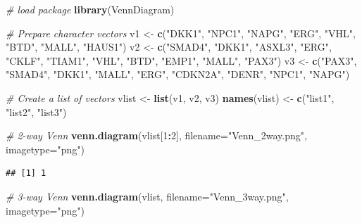 \documentclass[]{book}
\newenvironment{Shaded}{\begin{snugshade}}{\end{snugshade}}
\newcommand{\CommentTok}[1]{\textcolor[rgb]{0.56,0.35,0.01}{\textit{#1}}}
\newcommand{\DataTypeTok}[1]{\textcolor[rgb]{0.13,0.29,0.53}{#1}}
\newcommand{\DecValTok}[1]{\textcolor[rgb]{0.00,0.00,0.81}{#1}}
\newcommand{\KeywordTok}[1]{\textcolor[rgb]{0.13,0.29,0.53}{\textbf{#1}}}
\newcommand{\NormalTok}[1]{#1}
\newcommand{\OperatorTok}[1]{\textcolor[rgb]{0.81,0.36,0.00}{\textbf{#1}}}
\newcommand{\StringTok}[1]{\textcolor[rgb]{0.31,0.60,0.02}{#1}}
\begin{document}
\begin{Shaded}
\begin{Highlighting}[]
\CommentTok{# load package}
\KeywordTok{library}\NormalTok{(VennDiagram)}

\CommentTok{# Prepare character vectors}
\NormalTok{v1 <-}\StringTok{ }\KeywordTok{c}\NormalTok{(}\StringTok{"DKK1"}\NormalTok{, }\StringTok{"NPC1"}\NormalTok{, }\StringTok{"NAPG"}\NormalTok{, }\StringTok{"ERG"}\NormalTok{, }\StringTok{"VHL"}\NormalTok{, }\StringTok{"BTD"}\NormalTok{, }\StringTok{"MALL"}\NormalTok{, }\StringTok{"HAUS1"}\NormalTok{)}
\NormalTok{v2 <-}\StringTok{ }\KeywordTok{c}\NormalTok{(}\StringTok{"SMAD4"}\NormalTok{, }\StringTok{"DKK1"}\NormalTok{, }\StringTok{"ASXL3"}\NormalTok{, }\StringTok{"ERG"}\NormalTok{, }\StringTok{"CKLF"}\NormalTok{, }\StringTok{"TIAM1"}\NormalTok{, }\StringTok{"VHL"}\NormalTok{, }\StringTok{"BTD"}\NormalTok{, }\StringTok{"EMP1"}\NormalTok{, }\StringTok{"MALL"}\NormalTok{, }\StringTok{"PAX3"}\NormalTok{)}
\NormalTok{v3 <-}\StringTok{ }\KeywordTok{c}\NormalTok{(}\StringTok{"PAX3"}\NormalTok{, }\StringTok{"SMAD4"}\NormalTok{, }\StringTok{"DKK1"}\NormalTok{, }\StringTok{"MALL"}\NormalTok{, }\StringTok{"ERG"}\NormalTok{, }\StringTok{"CDKN2A"}\NormalTok{, }\StringTok{"DENR"}\NormalTok{, }\StringTok{"NPC1"}\NormalTok{, }\StringTok{"NAPG"}\NormalTok{)}

\CommentTok{# Create a list of vectors}
\NormalTok{vlist <-}\StringTok{ }\KeywordTok{list}\NormalTok{(v1, v2, v3)}
\KeywordTok{names}\NormalTok{(vlist) <-}\StringTok{ }\KeywordTok{c}\NormalTok{(}\StringTok{"list1"}\NormalTok{, }\StringTok{"list2"}\NormalTok{, }\StringTok{"list3"}\NormalTok{)}

\CommentTok{# 2-way Venn}
\KeywordTok{venn.diagram}\NormalTok{(vlist[}\DecValTok{1}\OperatorTok{:}\DecValTok{2}\NormalTok{], }
    \DataTypeTok{filename=}\StringTok{"Venn_2way.png"}\NormalTok{,}
    \DataTypeTok{imagetype=}\StringTok{"png"}\NormalTok{)}
\end{Highlighting}
\end{Shaded}

\begin{verbatim}
## [1] 1
\end{verbatim}

\begin{Shaded}
\begin{Highlighting}[]
\CommentTok{# 3-way Venn}
\KeywordTok{venn.diagram}\NormalTok{(vlist, }
        \DataTypeTok{filename=}\StringTok{"Venn_3way.png"}\NormalTok{,}
        \DataTypeTok{imagetype=}\StringTok{"png"}\NormalTok{)}
\end{Highlighting}
\end{Shaded}
\end{document}
